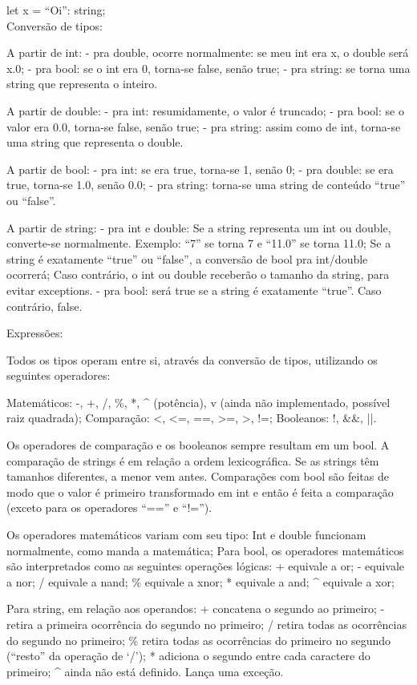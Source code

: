 \documentclass[12pt,a4paper]{article}
\begin{document}
let x = ``Oi'': string;\\

Conversão de tipos:

A partir de int:
- pra double, ocorre normalmente: se meu int era x, o double será x.0;
- pra bool: se o int era 0, torna-se false, senão true;
- pra string: se torna uma string que representa o inteiro.

A partir de double:
- pra int: resumidamente, o valor é truncado;
- pra bool: se o valor era 0.0, torna-se false, senão true;
- pra string: assim como de int, torna-se uma string que representa o double.

A partir de bool:
- pra int: se era true, torna-se 1, senão 0;
- pra double: se era true, torna-se 1.0, senão 0.0;
- pra string: torna-se uma string de conteúdo ``true'' ou ``false''.

A partir de string:
- pra int e double:
Se a string representa um int ou double, converte-se normalmente. Exemplo: ``7'' se torna 7 e ``11.0'' se torna 11.0;
Se a string é exatamente ``true'' ou ``false'', a conversão de bool pra int/double ocorrerá;
Caso contrário, o int ou double receberão o tamanho da string, para evitar exceptions.
- pra bool: será true se a string é exatamente ``true''. Caso contrário, false.


Expressões:

Todos os tipos operam entre si, através da conversão de tipos, utilizando os seguintes operadores:

Matemáticos: -, +, /, \%, *, ^ (potência), v (ainda não implementado, possível raiz quadrada);
Comparação: <, <=, ==, >=, >, !=;
Booleanos: !, &&, ||.

Os operadores de comparação e os booleanos sempre resultam em um bool. A comparação de strings é em relação a ordem lexicográfica. Se as strings têm tamanhos diferentes, a menor vem antes. Comparações com bool são feitas de modo que o valor é primeiro transformado em int e então é feita a comparação (exceto para os operadores ``=='' e ``!='').

Os operadores matemáticos variam com seu tipo:
Int e double funcionam normalmente, como manda a matemática;
Para bool, os operadores matemáticos são interpretados como as seguintes operações lógicas:
+ equivale a or;
- equivale a nor;
/ equivale a nand;
\% equivale a xnor;
* equivale a and;
^ equivale a xor;

Para string, em relação aos operandos:
+ concatena o segundo ao primeiro;
- retira a primeira ocorrência do segundo no primeiro;
/ retira todas as ocorrências do segundo no primeiro;
\% retira todas as ocorrências do primeiro no segundo (``resto'' da operação de `/');
* adiciona o segundo entre cada caractere do primeiro;
^ ainda não está definido. Lança uma exceção.
\end{document}
